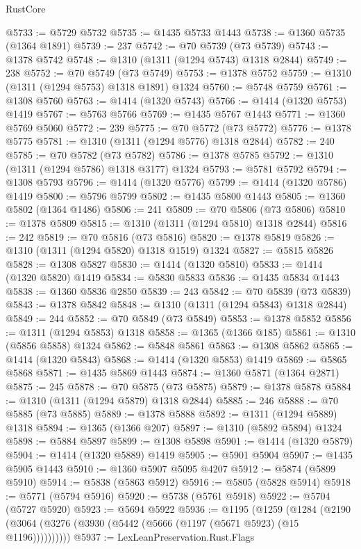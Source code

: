 \begin{lexlean}{RustCore}
\begin{coremodule}
@5733 := @5729 @5732
@5735 := @1435 @5733 @1443
@5738 := @1360 @5735 (@1364 @1891)
@5739 := 237
@5742 := @70 @5739 (@73 @5739)
@5743 := @1378 @5742
@5748 := @1310 (@1311 (@1294 @5743) @1318 @2844)
@5749 := 238
@5752 := @70 @5749 (@73 @5749)
@5753 := @1378 @5752
@5759 := @1310 (@1311 (@1294 @5753) @1318 @1891) @1324
@5760 := @5748 @5759
@5761 := @1308 @5760
@5763 := @1414 (@1320 @5743)
@5766 := @1414 (@1320 @5753) @1419
@5767 := @5763 @5766
@5769 := @1435 @5767 @1443
@5771 := @1360 @5769 @5060
@5772 := 239
@5775 := @70 @5772 (@73 @5772)
@5776 := @1378 @5775
@5781 := @1310 (@1311 (@1294 @5776) @1318 @2844)
@5782 := 240
@5785 := @70 @5782 (@73 @5782)
@5786 := @1378 @5785
@5792 := @1310 (@1311 (@1294 @5786) @1318 @3177) @1324
@5793 := @5781 @5792
@5794 := @1308 @5793
@5796 := @1414 (@1320 @5776)
@5799 := @1414 (@1320 @5786) @1419
@5800 := @5796 @5799
@5802 := @1435 @5800 @1443
@5805 := @1360 @5802 (@1364 @1486)
@5806 := 241
@5809 := @70 @5806 (@73 @5806)
@5810 := @1378 @5809
@5815 := @1310 (@1311 (@1294 @5810) @1318 @2844)
@5816 := 242
@5819 := @70 @5816 (@73 @5816)
@5820 := @1378 @5819
@5826 := @1310 (@1311 (@1294 @5820) @1318 @1519) @1324
@5827 := @5815 @5826
@5828 := @1308 @5827
@5830 := @1414 (@1320 @5810)
@5833 := @1414 (@1320 @5820) @1419
@5834 := @5830 @5833
@5836 := @1435 @5834 @1443
@5838 := @1360 @5836 @2850
@5839 := 243
@5842 := @70 @5839 (@73 @5839)
@5843 := @1378 @5842
@5848 := @1310 (@1311 (@1294 @5843) @1318 @2844)
@5849 := 244
@5852 := @70 @5849 (@73 @5849)
@5853 := @1378 @5852
@5856 := @1311 (@1294 @5853) @1318
@5858 := @1365 (@1366 @185)
@5861 := @1310 (@5856 @5858) @1324
@5862 := @5848 @5861
@5863 := @1308 @5862
@5865 := @1414 (@1320 @5843)
@5868 := @1414 (@1320 @5853) @1419
@5869 := @5865 @5868
@5871 := @1435 @5869 @1443
@5874 := @1360 @5871 (@1364 @2871)
@5875 := 245
@5878 := @70 @5875 (@73 @5875)
@5879 := @1378 @5878
@5884 := @1310 (@1311 (@1294 @5879) @1318 @2844)
@5885 := 246
@5888 := @70 @5885 (@73 @5885)
@5889 := @1378 @5888
@5892 := @1311 (@1294 @5889) @1318
@5894 := @1365 (@1366 @207)
@5897 := @1310 (@5892 @5894) @1324
@5898 := @5884 @5897
@5899 := @1308 @5898
@5901 := @1414 (@1320 @5879)
@5904 := @1414 (@1320 @5889) @1419
@5905 := @5901 @5904
@5907 := @1435 @5905 @1443
@5910 := @1360 @5907 @5095 @4207
@5912 := @5874 (@5899 @5910)
@5914 := @5838 (@5863 @5912)
@5916 := @5805 (@5828 @5914)
@5918 := @5771 (@5794 @5916)
@5920 := @5738 (@5761 @5918)
@5922 := @5704 (@5727 @5920)
@5923 := @5694 @5922
@5936 := @1195
    (@1259
      (@1284 (@2190 (@3064 (@3276 (@3930 (@5442 (@5666 (@1197 (@5671 @5923) (@15 @1196))))))))))
@5937 := LexLeanPreservation.Rust.Flags

\end{coremodule}
\end{lexlean}
